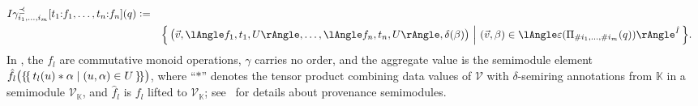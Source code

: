 \begin{toappendix}
\begin{description}
\begin{align*}
{        I}{\gamma^{\preceq}_{i_1,\dots,i_m}[t_1{:}f_1,\dots,t_n{:}f_n](q)}\defeq\\
        &\quad\Bigl\{\,\bigl(\vec v,\lAngle f_1,t_1,U\rAngle,\dots,
        \lAngle f_n,t_n,U\rAngle,\delta(\beta)\bigr)\ \Big|\
        (\vec v,\beta)\in\angsem{\hat
        I}{\epsilon(\Pi_{\#i_1,\dots,\#i_m}(q))}\,\Bigr\}.
      \end{align*}
      In \cite{sen2026provsql}, the $f_l$ are commutative monoid
      operations, $\gamma$ carries no order, and the aggregate value is the
      semimodule element $\hat f_l\bigl(\{\!\{\,t_l(u)*\alpha \mid
      (u,\alpha)\in U\,\}\!\}\bigr)$, where ``$*$'' denotes the tensor product
      combining data values of $\mathcal{V}$ with $\delta$-semiring
      annotations from $\mathbb{K}$ in a semimodule
      $\mathcal{V}_{\mathbb{K}}$, and $\hat f_l$ is $f_l$ lifted to
      $\mathcal{V}_\mathbb{K}$; see~\cite{amsterdamer2011provenance} for
      details about provenance semimodules.
  \end{description}
\end{toappendix}
